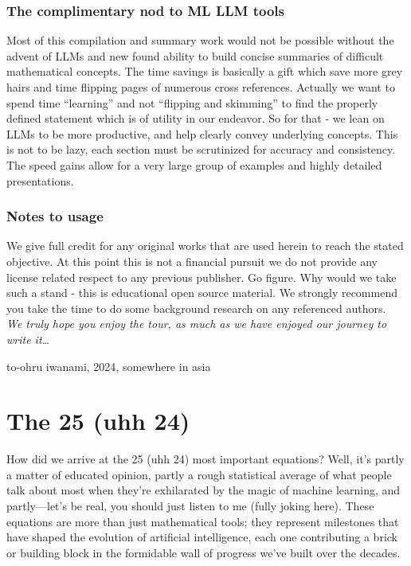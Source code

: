 \documentclass[
  12 pt,
  a4paper,
]{book}
\numberwithin{equation}{section}
\theoremstyle{plain}      %
\theoremstyle{definition} %
\theoremstyle{remark}     %
\theoremstyle{note}         %
\begin{document}
\hypertarget{the-complimentary-nod-to-ml-llm-tools}{%
\subsection*{The complimentary nod to ML LLM
tools}\label{the-complimentary-nod-to-ml-llm-tools}}

Most of this compilation and summary work would not be possible without
the advent of LLMs and new found ability to build concise summaries of
difficult mathematical concepts. The time savings is basically a gift
which save more grey hairs and time flipping pages of numerous cross
references. Actually we want to spend time ``learning'' and not
``flipping and skimming'' to find the properly defined statement which
is of utility in our endeavor. So for that - we lean on LLMs to be more
productive, and help clearly convey underlying concepts. This is not to
be lazy, each section must be scrutinized for accuracy and consistency.
The speed gains allow for a very large group of examples and highly
detailed presentations.

\hypertarget{notes-to-usage}{%
\subsection*{Notes to usage}\label{notes-to-usage}}

We give full credit for any original works that are used herein to reach
the stated objective. At this point this is not a financial pursuit we
do not provide any license related respect to any previous publisher. Go
figure. Why would we take such a stand - this is educational open source
material. We strongly recommend you take the time to do some background
research on any referenced authors.\\

\emph{We truly hope you enjoy the tour, as much as we have enjoyed our
journey to write it\ldots{}}

to-ohru iwanami, 2024, somewhere in asia

\hypertarget{the-25-uhh-24}{%
\chapter{The 25 (uhh 24)}\label{the-25-uhh-24}}

How did we arrive at the 25 (uhh 24) most important equations? Well,
it's partly a matter of educated opinion, partly a rough statistical
average of what people talk about most when they're exhilarated by the
magic of machine learning, and partly---let's be real, you should just
listen to me (fully joking here). These equations are more than just
mathematical tools; they represent milestones that have shaped the
evolution of artificial intelligence, each one contributing a brick or
building block in the formidable wall of progress we've built over the
decades.
\end{document}
